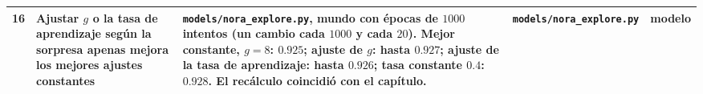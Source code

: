 {\begin{longtable}{>{\raggedright}p{0.5cm}>{\raggedright}p{4.0cm}>{\raggedright}p{5.6cm}>{\raggedright}p{2.3cm}>{\raggedright\arraybackslash}p{1.7cm}}
16 & Ajustar $g$ o la tasa de aprendizaje según la sorpresa apenas mejora los mejores ajustes constantes & \texttt{models/nora\_explore.py}, mundo con épocas de $1000$ intentos (un cambio cada $1000$ y cada $20$). Mejor constante, $g=8$: $0.925$; ajuste de $g$: hasta $0.927$; ajuste de la tasa de aprendizaje: hasta $0.926$; tasa constante $0.4$: $0.928$. El recálculo coincidió con el capítulo. & \texttt{models/\allowbreak nora\_\allowbreak explore.py} & modelo \\
\bottomrule
\end{longtable}}
